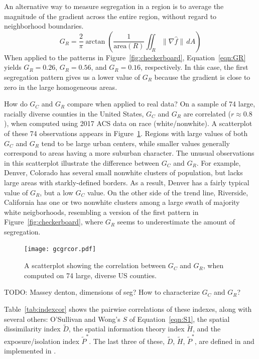 \documentclass{article}
\theoremstyle{theorem}
\theoremstyle{definition}
\begin{document}
An alternative way to measure segregation in a region is to average the magnitude of the gradient across the entire region, without regard to neighborhood boundaries.
\begin{equation}\label{eqn:GR}
   G_R = \frac{2}{\pi} \arctan \left(\frac{1}{\mathrm{area}(R)} \iint_R \lVert \nabla \hat{f} \rVert \, dA \right)
\end{equation}
When applied to the patterns in Figure~\ref{fig:checkerboard}, Equation~\ref{eqn:GR} yields $G_R = 0.26$, $G_R = 0.56$, and $G_R = 0.16$, respectively. In this case, the first segregation pattern gives us a lower value of $G_R$ because the gradient is close to zero in the large homogeneous areas.

How do $G_C$ and $G_R$ compare when applied to real data? On a sample of 74 large, racially diverse counties in the United States, $G_C$ and $G_R$ are correlated ($r \approx 0.8$), when computed using 2017 ACS data on race (white/nonwhite). A scatterplot of these 74 observations appears in Figure~\ref{fig:gcgrcor}. Regions with large values of both $G_C$ and $G_R$ tend to be large urban centers, while smaller values generally correspond to areas having a more suburban character. The unusual observations in this scatterplot illustrate the difference between $G_C$ and $G_R$. For example, Denver, Colorado has several small nonwhite clusters of population, but lacks large areas with starkly-defined borders. As a result, Denver has a fairly typical value of $G_R$, but a low $G_C$ value. On the other side of the trend line, Riverside, California has one or two nonwhite clusters among a large swath of majority white neigborhoods, resembling a version of the first pattern in Figure~\ref{fig:checkerboard}, where $G_R$ seems to underestimate the amount of segregation.

\begin{figure}
  \texttt{[image: gcgrcor.pdf]}
  \caption{A scatterplot showing the correlation between $G_C$ and $G_R$, when computed on 74 large, diverse US counties.}
  \label{fig:gcgrcor}
\end{figure}

TODO: Massey denton, dimensions of seg? How to characterize $G_C$ and $G_R$?

Table~\ref{tab:indexcor} shows the pairwise correlations of these indexes, along with several others: O'Sullivan and Wong's $S$ of Equation~\ref{eqn:S1}, the spatial dissimilarity index $\tilde{D}$, the spatial information theory index $\tilde{H}$, and the exposure/isolation index $\tilde{P}^*$. The last three of these, $\tilde{D}$, $\tilde{H}$, $\tilde{P}^*$, are defined in \cite{reardonosullivan04} and implemented in \cite{hong14}.
\end{document}
